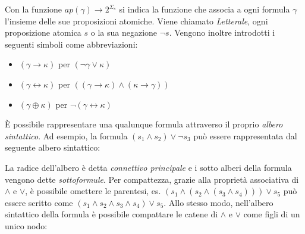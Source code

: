 \documentclass[./main.tex]{subfiles}
\begin{document}
Con la funzione $ap(\gamma) \rightarrow 2^{\Sigma_s}$ si indica la funzione che
associa a ogni formula $\gamma$ l'insieme delle sue proposizioni atomiche. 
Viene chiamato \textit{Letterale}, ogni proposizione atomica $s$ o la sua negazione $\lnot s$.
Vengono inoltre introdotti i seguenti simboli come abbreviazioni:

\begin{itemize}
    \item $(\gamma \rightarrow \kappa)$ per $(\lnot \gamma \lor \kappa)$
    \item $(\gamma \leftrightarrow \kappa)$ per $((\gamma \rightarrow \kappa) \land (\kappa \rightarrow \gamma))$
    \item $(\gamma \oplus \kappa)$ per $\lnot(\gamma \leftrightarrow \kappa)$
\end{itemize}

È possibile rappresentare una qualunque formula attraverso il proprio \textit{albero sintattico}.
Ad esempio, la formula 
$(s_1 \land s_2) \lor \lnot s_3$ può essere rappresentata dal seguente albero sintattico:

\begin{center}
\end{center}


La radice dell'albero è detta \textit{connettivo principale} e i sotto alberi della formula vengono dette \textit{sottoformule}.
 Per compattezza, grazie alla proprietà associativa di $\land$ e $\lor$, è possibile omettere le parentesi, es. 
$(s_1 \land (s_2 \land (s_3 \land s_4))) \lor s_5$ può essere scritto come $(s_1 \land s_2 \land s_3 \land s_4) \lor s_5$. 
Allo stesso modo, nell'albero sintattico della formula è possibile compattare le catene di $\land$ e $\lor$ come figli di un unico nodo:

\begin{center}
\end{center}
\end{document}
